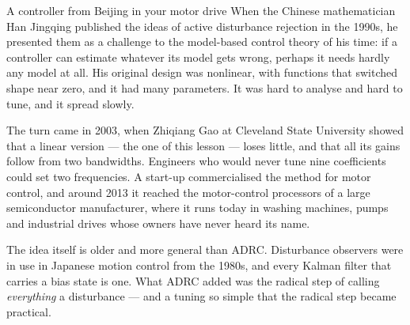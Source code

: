 \begin{curiosity}{A controller from Beijing in your motor drive}
When the Chinese mathematician Han Jingqing published the ideas of active disturbance rejection in the 1990s, he presented them as a challenge to the model-based control theory of his time: if a controller can estimate whatever its model gets wrong, perhaps it needs hardly any model at all. His original design was nonlinear, with functions that switched shape near zero, and it had many parameters. It was hard to analyse and hard to tune, and it spread slowly.

The turn came in 2003, when Zhiqiang Gao at Cleveland State University showed that a linear version — the one of this lesson — loses little, and that all its gains follow from two bandwidths. Engineers who would never tune nine coefficients could set two frequencies. A start-up commercialised the method for motor control, and around 2013 it reached the motor-control processors of a large semiconductor manufacturer, where it runs today in washing machines, pumps and industrial drives whose owners have never heard its name.

The idea itself is older and more general than ADRC. Disturbance observers were in use in Japanese motion control from the 1980s, and every Kalman filter that carries a bias state is one. What ADRC added was the radical step of calling \emph{everything} a disturbance — and a tuning so simple that the radical step became practical.
\end{curiosity}

